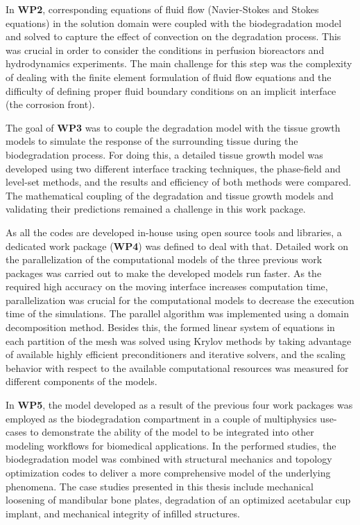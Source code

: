 In \textbf{WP2}, corresponding equations of fluid flow (Navier-Stokes and Stokes equations) in the solution domain were coupled with the biodegradation model and solved to capture the effect of convection on the degradation process. This was crucial in order to consider the conditions in perfusion bioreactors and hydrodynamics experiments. The main challenge for this step was the complexity of dealing with the finite element formulation of fluid flow equations and the difficulty of defining proper fluid boundary conditions on an implicit interface (the corrosion front).

The goal of \textbf{WP3} was to couple the degradation model with the tissue growth models to simulate the response of the surrounding tissue during the biodegradation process. For doing this, a detailed tissue growth model was developed using two different interface tracking techniques, the phase-field and level-set methods, and the results and efficiency of both methods were compared. The mathematical coupling of the degradation and tissue growth models and validating their predictions remained a challenge in this work package.

As all the codes are developed in-house using open source tools and libraries, a dedicated work package (\textbf{WP4}) was defined to deal with that. Detailed work on the parallelization of the computational models of the three previous work packages was carried out to make the developed models run faster. As the required high accuracy on the moving interface increases computation time, parallelization was crucial for the computational models to decrease the execution time of the simulations. The parallel algorithm was implemented using a domain decomposition method. Besides this, the formed linear system of equations in each partition of the mesh was solved using Krylov methods by taking advantage of available highly efficient preconditioners and iterative solvers, and the scaling behavior with respect to the available computational resources was measured for different components of the models.

In \textbf{WP5}, the model developed as a result of the previous four work packages was employed as the biodegradation compartment in a couple of multiphysics use-cases to demonstrate the ability of the model to be integrated into other modeling workflows for biomedical applications. In the performed studies, the biodegradation model was combined with structural mechanics and topology optimization codes to deliver a more comprehensive model of the underlying phenomena. The case studies presented in this thesis include mechanical loosening of mandibular bone plates, degradation of an optimized acetabular cup implant, and mechanical integrity of infilled structures.


